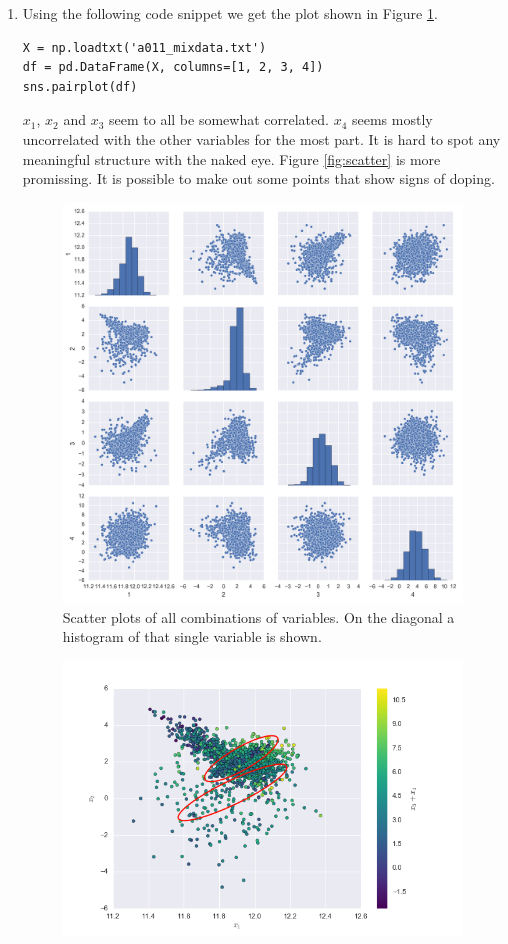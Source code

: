 \documentclass[a4paper]{article}
\begin{document}
\begin{enumerate}
\item 
Using the following code snippet we get the plot shown in Figure \ref{fig:expl}.
\begin{lstlisting}
X = np.loadtxt('a011_mixdata.txt')
df = pd.DataFrame(X, columns=[1, 2, 3, 4])
sns.pairplot(df)
\end{lstlisting}
 $x_1$, $x_2$ and $x_3$ seem to all be somewhat correlated. $x_4$ seems mostly uncorrelated with the other variables for the most part. It is hard to spot any meaningful structure with the naked eye. Figure \ref{fig:scatter} is more promissing. It is possible to make out some points that show signs of doping.
\begin{figure}
\centering
\includegraphics[width=\linewidth]{figures/EM_expl.png}
\caption{Scatter plots of all combinations of variables. On the diagonal a histogram of that single variable is shown.}
\label{fig:expl}
\end{figure}
\begin{figure}[H]
\centering
\includegraphics[width=.8\linewidth]{figures/scatter.png}

\end{figure}
\end{enumerate}
\end{document}
